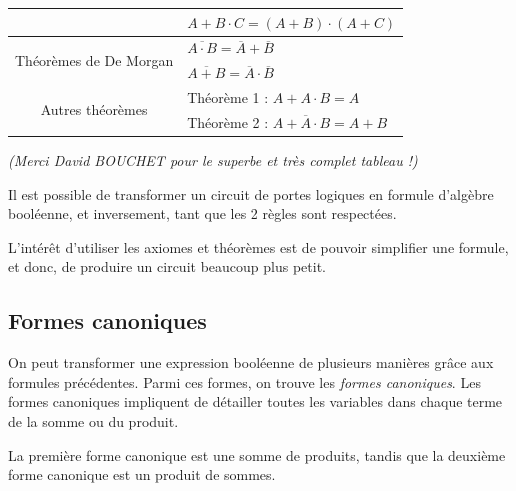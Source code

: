 \documentclass[11pt,a4paper]{article}
\begin{document}
\begin{center}
\begin{tabular}{| c | l |}
         & $ A + B \cdot C = (A + B) \cdot (A + C) $ \\
\hline
\multirow[c]{2}{*}[0in]{Théorèmes de De Morgan} & $ \overline{A \cdot B} = \overline{A} + \overline{B} $    \phantom{$ \overline{\overline{A}} $} \\
         & $ \overline{A + B} = \overline{A} \cdot \overline{B} $ \\
\hline
\multirow[c]{2}{*}[0in]{Autres théorèmes} & Théorème 1 : $ A + A \cdot B = A $ \\
         & Théorème 2 : $ A + \overline{A} \cdot B = A + B $ \\
\hline
\end{tabular}

\smallskip

\textit{(Merci David BOUCHET pour le superbe et très complet tableau !)}

\end{center}


Il est possible de transformer un circuit de portes logiques en formule d'algèbre booléenne, et inversement, tant que les 2 règles sont respectées.

L'intérêt d'utiliser les axiomes et théorèmes est de pouvoir simplifier une formule, et donc, de produire un circuit beaucoup plus petit.


\bigskip


\subsection{Formes canoniques}

On peut transformer une expression booléenne de plusieurs manières grâce aux formules précédentes.
Parmi ces formes, on trouve les \textit{formes canoniques}.
Les formes canoniques impliquent de détailler toutes les variables dans chaque terme de la somme ou du produit.

\smallskip

La première forme canonique est une somme de produits, tandis que la deuxième forme canonique est un produit de sommes.

\medskip


\end{document}
